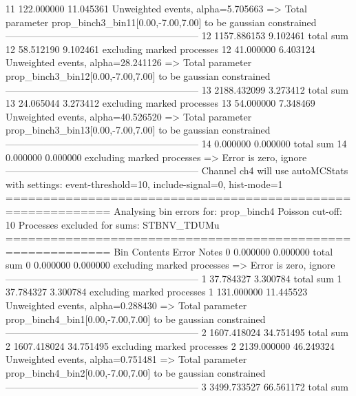 11         122.000000      11.045361       Unweighted events, alpha=5.705663
  => Total parameter prop_binch3_bin11[0.00,-7.00,7.00] to be gaussian constrained
------------------------------------------------------------
12         1157.886153     9.102461        total sum                     
12         58.512190       9.102461        excluding marked processes    
12         41.000000       6.403124        Unweighted events, alpha=28.241126
  => Total parameter prop_binch3_bin12[0.00,-7.00,7.00] to be gaussian constrained
------------------------------------------------------------
13         2188.432099     3.273412        total sum                     
13         24.065044       3.273412        excluding marked processes    
13         54.000000       7.348469        Unweighted events, alpha=40.526520
  => Total parameter prop_binch3_bin13[0.00,-7.00,7.00] to be gaussian constrained
------------------------------------------------------------
14         0.000000        0.000000        total sum                     
14         0.000000        0.000000        excluding marked processes    
  => Error is zero, ignore      
------------------------------------------------------------
Channel ch4 will use autoMCStats with settings: event-threshold=10, include-signal=0, hist-mode=1
============================================================
Analysing bin errors for: prop_binch4
Poisson cut-off: 10
Processes excluded for sums: STBNV_TDUMu
============================================================
Bin        Contents        Error           Notes                         
0          0.000000        0.000000        total sum                     
0          0.000000        0.000000        excluding marked processes    
  => Error is zero, ignore      
------------------------------------------------------------
1          37.784327       3.300784        total sum                     
1          37.784327       3.300784        excluding marked processes    
1          131.000000      11.445523       Unweighted events, alpha=0.288430
  => Total parameter prop_binch4_bin1[0.00,-7.00,7.00] to be gaussian constrained
------------------------------------------------------------
2          1607.418024     34.751495       total sum                     
2          1607.418024     34.751495       excluding marked processes    
2          2139.000000     46.249324       Unweighted events, alpha=0.751481
  => Total parameter prop_binch4_bin2[0.00,-7.00,7.00] to be gaussian constrained
------------------------------------------------------------
3          3499.733527     66.561172       total sum                     
